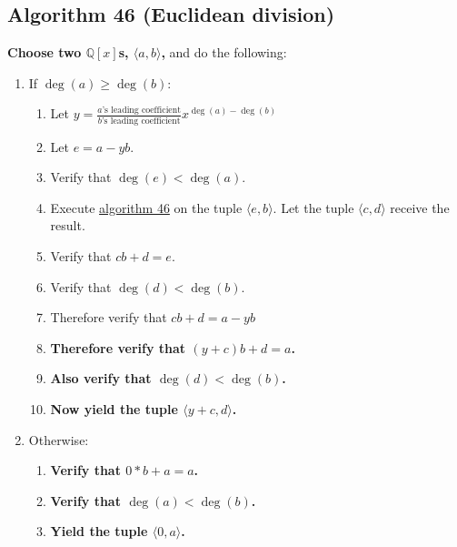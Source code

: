 \documentclass[twocolumn]{article}
\begin{document}
		\subsection{Algorithm 46 (Euclidean division)}\label{sec:algorithm 46}
			\textbf{Choose two $\mathbb{Q}[x]$s, $\langle a,b\rangle$,} and do the following:
			\begin{enumerate}
				\item If $\deg(a)\ge\deg(b)$:
				\begin{enumerate}
					\item Let $y=\frac{\text{$a$'s leading coefficient}}{\text{$b$'s leading coefficient}}x^{\deg(a)-\deg(b)}$
					\item Let $e=a-yb$.
					\item Verify that $\deg(e)<\deg(a)$.
					\item Execute \hyperref[sec:algorithm 46]{algorithm 46} on the tuple $\langle e,b\rangle$. Let the tuple $\langle c,d\rangle$ receive the result.
					\item Verify that $cb+d=e$.
					\item Verify that $\deg(d)<\deg(b)$.
					\item Therefore verify that $cb+d=a-yb$
					\item \textbf{Therefore verify that $(y+c)b+d=a$.}
					\item \textbf{Also verify that $\deg(d)<\deg(b)$.}
					\item \textbf{Now yield the tuple $\langle y+c, d\rangle$.}
				\end{enumerate}
				\item Otherwise:
				\begin{enumerate}
					\item \textbf{Verify that $0*b+a=a$.}
					\item \textbf{Verify that $\deg(a)<\deg(b)$.}
					\item \textbf{Yield the tuple $\langle 0,a\rangle$.}
				\end{enumerate}
			\end{enumerate}
\end{document}
